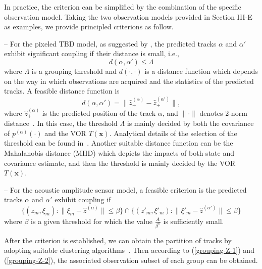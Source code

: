 \documentclass[journal]{IEEEtran}
\newcommand{\bx}{{\mathbf x}}
\begin{document}
{In practice, the criterion can be simplified by the combination of the specific observation model.  Taking the two observation models provided in Section III-E as examples, we provide principled criterions as follow.


 -- For the pixeled TBD model, 
 as suggested by \cite{refr:tbd-2,refr:tbd-3, refr:tbd-4},  the  predicted tracks $\alpha$ and $\alpha'$ exhibit significant coupling 
if their distance is small, i.e.,
\begin{equation}\label{grouping}
d(\alpha,\alpha')\leqslant \Lambda
\end{equation}
where  $\Lambda$ is a grouping threshold and $d(\cdot,\cdot)$ is a distance function which depends on the way in which observations are acquired and the statistics of the predicted tracks.  A feasible  distance function is  
\begin{equation}\label{distance-function}
d(\alpha,\alpha')=\| \hat z_+^{(\alpha)}-\hat z_+^{(\alpha')}\|,
\end{equation}
where $\hat z_+^{(\alpha)}$ is the  predicted position of the track $\alpha$, and $\|\cdot\|$ denotes 2-norm distance~\cite{refr:tbd-2,refr:tbd-3, refr:tbd-4}. 
In this case, the threshold $\Lambda$ is mainly decided by both the covariance of   $p^{(\alpha)}(\cdot)$ and the VOR $T(\bx)$. Analytical details of the selection of the threshold can be found in~\cite{refr:tbd-3}. 
Another suitable distance function can be the Mahalanobis distance (MHD) which depicts the impacts of both state and covariance estimate, and then the threshold is mainly  decided by the VOR $T(\bx)$.
 
-- For the acoustic amplitude sensor model, a feasible    criterion is   the predicted tracks $\alpha$ and $\alpha'$ exhibit coupling if
\begin{equation}\label{grouping-threshold}
\{(z_{m},\xi_{m}): \|\xi_{m}-\hat z^{(\alpha)}\|\leqslant \beta\}\cap \{(z'_{m},\xi'_{m}): \|\xi'_{m}-\hat z^{(\alpha')}\|\leqslant \beta\}
\end{equation}
 where  $\beta$ is a given threshold for which the value $\frac{A}{\beta^{\kappa}}$ is sufficiently small. 


After the criterion is established, we can obtain the partition of tracks by adopting suitable clustering algorithms~\cite{refr:clustering_method}. 
Then according to (\ref{grouping-Z-1}) and (\ref{grouping-Z-2}), the associated observation subset of each group can be obtained.







}
\end{document}
